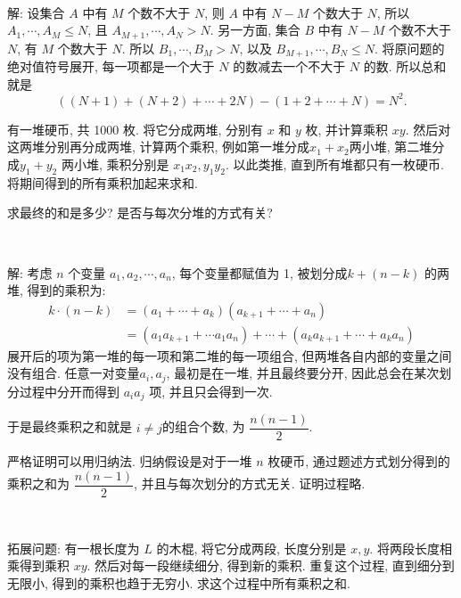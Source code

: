 ~

解: 设集合 $A$ 中有 $M$ 个数不大于 $N$, 则 $A$ 中有 $N-M$ 个数大于 $N$, 所以 $A_1, \cdots, A_M \le N$, 且 $A_{M+1}, \cdots, A_N > N$. 另一方面, 集合 $B$ 中有 $N-M$ 个数不大于 $N$, 有 $M$ 个数大于 $N$. 所以 $B_1, \cdots, B_M > N$, 以及 $B_{M+1}, \cdots, B_N \le N$. 将原问题的绝对值符号展开, 每一项都是一个大于 $N$ 的数减去一个不大于 $N$ 的数. 所以总和就是
$$
\left((N+1) + (N+2) + \cdots + 2N\right) - (1+2+\cdots+N) = N^2.
$$


\newpage
有一堆硬币, 共 1000 枚. 将它分成两堆, 分别有 $x$ 和 $y$ 枚, 并计算乘积 $xy$. 然后对这两堆分别再分成两堆, 计算两个乘积, 例如第一堆分成$x_1+x_2$两小堆, 第二堆分成$y_1+y_2$ 两小堆, 乘积分别是 $x_1x_2, y_1y_2$. 以此类推, 直到所有堆都只有一枚硬币. 将期间得到的所有乘积加起来求和. 

求最终的和是多少? 是否与每次分堆的方式有关?

~

解: 考虑 $n$ 个变量 $a_1, a_2, \cdots, a_n$, 每个变量都赋值为 1, 被划分成$k+(n-k)$ 的两堆, 得到的乘积为:
\begin{align*}
k\cdot(n-k) &=(a_1+\cdots+a_k)(a_{k+1}+\cdots+a_n) \\
& = (a_1a_{k+1}+\cdots a_1a_n)+\cdots+(a_ka_{k+1}+\cdots+a_ka_n)
\end{align*}
展开后的项为第一堆的每一项和第二堆的每一项组合, 但两堆各自内部的变量之间没有组合. 任意一对变量$a_i, a_j$, 最初是在一堆, 并且最终要分开, 因此总会在某次划分过程中分开而得到 $a_ia_j$ 项, 并且只会得到一次.

于是最终乘积之和就是 $i\neq j$的组合个数, 为 $\dfrac{n(n-1)}{2}$. 

严格证明可以用归纳法. 归纳假设是对于一堆 $n$ 枚硬币, 通过题述方式划分得到的乘积之和为 $\dfrac{n(n-1)}{2}$, 并且与每次划分的方式无关. 证明过程略.

~

拓展问题: 有一根长度为 $L$ 的木棍, 将它分成两段, 长度分别是 $x,y$. 将两段长度相乘得到乘积 $xy$. 然后对每一段继续细分, 得到新的乘积. 重复这个过程, 直到细分到无限小, 得到的乘积也趋于无穷小. 求这个过程中所有乘积之和.

